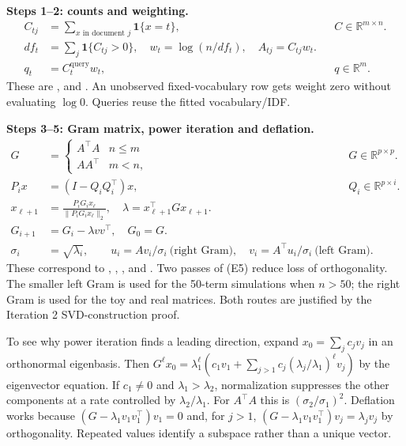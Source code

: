 \documentclass[11pt]{article}
\newcommand{\R}{\mathbb{R}}
\begin{document}
\textbf{Steps 1--2: counts and weighting.}
\begin{align}
C_{tj}&=\sum_{x\text{ in document }j}\mathbf1\{x=t\},
&& C\in\R^{m\times n}. \tag{E1}\\
df_t&=\sum_j\mathbf1\{C_{tj}>0\},\quad
w_t=\log(n/df_t),\quad A_{tj}=C_{tj}w_t. \tag{E2}\\
q_t&=C^{\mathrm{query}}_t w_t,
&&q\in\R^m. \tag{E3}
\end{align}
These are ,  and
. An unobserved fixed-vocabulary row gets weight
zero without evaluating $\log0$. Queries reuse the fitted vocabulary/IDF.

\textbf{Steps 3--5: Gram matrix, power iteration and deflation.}
\begin{align}
G&=\begin{cases}A^\top A&n\le m\\AA^\top&m<n,\end{cases}
&&G\in\R^{p\times p}. \tag{E4}\\
P_i x&=(I-Q_iQ_i^\top)x,
&&Q_i\in\R^{p\times i}. \tag{E5}\\
x_{\ell+1}&=\frac{P_iG_i x_\ell}{\|P_iG_i x_\ell\|_2},\quad
\lambda=x_{\ell+1}^\top Gx_{\ell+1}. \tag{E6}\\
G_{i+1}&=G_i-\lambda vv^\top,\quad G_0=G. \tag{E7}\\
\sigma_i&=\sqrt{\lambda_i},\qquad
u_i=Av_i/\sigma_i\ \text{(right Gram)},\quad
v_i=A^\top u_i/\sigma_i\ \text{(left Gram)}. \tag{E8}
\end{align}
These correspond to , ,
,  and
. Two passes of (E5) reduce loss of orthogonality.
The smaller left Gram is used for the 50-term simulations when $n>50$;
the right Gram is used for the toy and real matrices.
Both routes are justified by the Iteration 2 SVD-construction proof.

To see why power iteration finds a leading direction, expand
$x_0=\sum_j c_jv_j$ in an orthonormal eigenbasis. Then
$G^\ell x_0=\lambda_1^\ell(c_1v_1+
\sum_{j>1}c_j(\lambda_j/\lambda_1)^\ell v_j)$ by the eigenvector equation.
If $c_1\ne0$ and $\lambda_1>\lambda_2$, normalization suppresses the
other components at a rate controlled by $\lambda_2/\lambda_1$.
For $A^\top A$ this is $(\sigma_2/\sigma_1)^2$.
Deflation works because
$(G-\lambda_1v_1v_1^\top)v_1=0$ and, for $j>1$,
$(G-\lambda_1v_1v_1^\top)v_j=\lambda_jv_j$ by orthogonality.
Repeated values identify a subspace rather than a unique vector.
\end{document}

